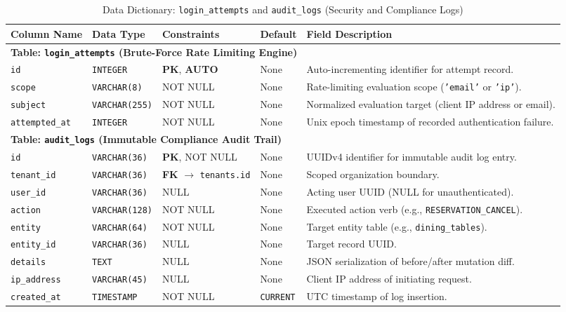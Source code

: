 \begin{table}[htbp]
\centering
\caption{Data Dictionary: \texttt{login\_attempts} and \texttt{audit\_logs} (Security and Compliance Logs)}
\label{tab:dict_gov_security}
\small
\begin{tabularx}{\textwidth}{llp{3.2cm}lX}
\toprule
\textbf{Column Name} & \textbf{Data Type} & \textbf{Constraints} & \textbf{Default} & \textbf{Field Description} \\
\midrule
\multicolumn{5}{l}{\textbf{Table: \texttt{login\_attempts} (Brute-Force Rate Limiting Engine)}} \\
\texttt{id} & \texttt{INTEGER} & \textbf{PK}, \textbf{AUTO} & None & Auto-incrementing identifier for attempt record. \\
\texttt{scope} & \texttt{VARCHAR(8)} & NOT NULL & None & Rate-limiting evaluation scope (\texttt{'email'} or \texttt{'ip'}). \\
\texttt{subject} & \texttt{VARCHAR(255)} & NOT NULL & None & Normalized evaluation target (client IP address or email). \\
\texttt{attempted\_at} & \texttt{INTEGER} & NOT NULL & None & Unix epoch timestamp of recorded authentication failure. \\
\midrule
\multicolumn{5}{l}{\textbf{Table: \texttt{audit\_logs} (Immutable Compliance Audit Trail)}} \\
\texttt{id} & \texttt{VARCHAR(36)} & \textbf{PK}, NOT NULL & None & UUIDv4 identifier for immutable audit log entry. \\
\texttt{tenant\_id} & \texttt{VARCHAR(36)} & \textbf{FK} $\to$ \texttt{tenants.id} & None & Scoped organization boundary. \\
\texttt{user\_id} & \texttt{VARCHAR(36)} & NULL & None & Acting user UUID (NULL for unauthenticated). \\
\texttt{action} & \texttt{VARCHAR(128)} & NOT NULL & None & Executed action verb (e.g., \texttt{RESERVATION\_CANCEL}). \\
\texttt{entity} & \texttt{VARCHAR(64)} & NOT NULL & None & Target entity table (e.g., \texttt{dining\_tables}). \\
\texttt{entity\_id} & \texttt{VARCHAR(36)} & NULL & None & Target record UUID. \\
\texttt{details} & \texttt{TEXT} & NULL & None & JSON serialization of before/after mutation diff. \\
\texttt{ip\_address} & \texttt{VARCHAR(45)} & NULL & None & Client IP address of initiating request. \\
\texttt{created\_at} & \texttt{TIMESTAMP} & NOT NULL & \texttt{CURRENT} & UTC timestamp of log insertion. \\
\bottomrule
\end{tabularx}
\end{table}

